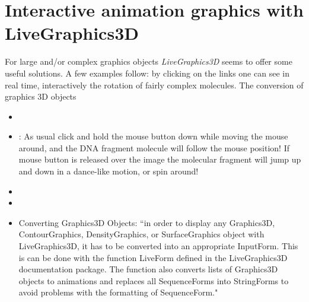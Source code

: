 \documentclass[12pt]{article}
\theoremstyle{plain}
\theoremstyle{definition}
\numberwithin{equation}{section}
\begin{document}
\section{Interactive animation graphics with LiveGraphics3D}
For large and/or complex graphics objects {\em LiveGraphics3D} seems to offer some
useful solutions. A few examples follow: by clicking on the links one can see in real time, interactively
the rotation of fairly complex molecules. The conversion of graphics 3D objects 

\begin{itemize}
\item {}
\item {} : As usual click and hold the mouse button down while moving the mouse around, and the DNA fragment molecule will follow the mouse position! If mouse button is released over the image the molecular fragment will jump up and down in a dance-like motion, or spin around!
\item {}
\item {}
\item Converting Graphics3D Objects: ``in order to display any Graphics3D, ContourGraphics, DensityGraphics, or SurfaceGraphics object with LiveGraphics3D, it has to be converted into an appropriate InputForm. This is can be done with the function LiveForm defined in the LiveGraphics3D documentation package. The function also converts lists of Graphics3D objects to animations and replaces all SequenceForms into StringForms to avoid problems with the formatting of SequenceForm."
\end{itemize}

\end{document}
